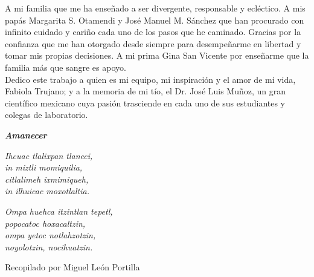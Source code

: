 \newpage

A mi familia que me ha enseñado a ser divergente, responsable y ecléctico. A mis papás Margarita S. Otamendi y José Manuel M. Sánchez que han procurado con infinito cuidado y cariño cada uno de los pasos que he caminado. Gracias por la confianza que me han otorgado desde siempre para desempeñarme en libertad y tomar mis propias decisiones. A mi prima Gina San Vicente por enseñarme que la familia más que sangre es apoyo.\\

Dedico este trabajo a quien es mi equipo, mi inspiración y el amor de mi vida, Fabiola Trujano; y a la memoria de mi tío, el Dr. José Luis Muñoz, un gran científico mexicano cuya pasión trasciende en cada uno de sus estudiantes y colegas de laboratorio.\\

\vspace{40mm} 

\begin{center}

\textbf{\textit{Amanecer}}\\
\vspace{2mm} 


\textit{Ihcuac tlalixpan tlaneci,}\\
\textit{in miztli momiquilia,}\\
\textit{citlalimeh ixmimiqueh,}\\
\textit{in ilhuicac moxotlaltia.}\\

\vspace{2mm} 

\textit{Ompa huehca itzintlan tepetl,}\\
\textit{popocatoc hoxacaltzin,}\\
\textit{ompa yetoc notlahzotzin,}\\
\textit{noyolotzin, nocihuatzin.}\\

\vspace{2mm}

Recopilado por Miguel León Portilla 

\end{center}